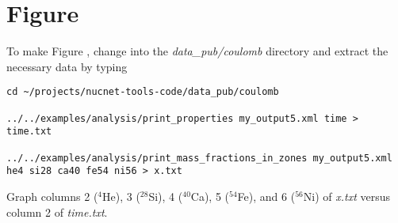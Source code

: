 \section*{Figure }
\hypertarget{sec:x}{}


\noindent To make Figure ,
change into the {\em data\_pub/coulomb} directory and extract the
necessary data by typing
\begin{verbatim}
cd ~/projects/nucnet-tools-code/data_pub/coulomb

../../examples/analysis/print_properties my_output5.xml time > time.txt

../../examples/analysis/print_mass_fractions_in_zones my_output5.xml he4 si28 ca40 fe54 ni56 > x.txt
\end{verbatim}
Graph columns 2 ($^4$He), 3 ($^{28}$Si), 4 ($^{40}$Ca), 5 ($^{54}$Fe), and
6 ($^{56}$Ni) of {\em x.txt} versus column 2 of {\em time.txt}.

\addtocounter{counter}{1}

